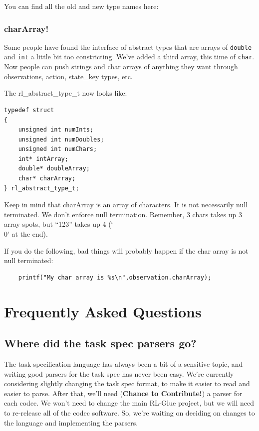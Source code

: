 \documentclass[11pt]{article}
\begin{document}
You can find all the old and new type names here:\newline
{}

\subsubsection{charArray!}
Some people have found the interface of abstract types that are arrays of \texttt{double} and \texttt{int} a little bit too constricting.  We've added a third array, this time of \texttt{char}.  Now people can push strings and char arrays of anything they want through observations, action, state\_key types, etc.

The rl\_abstract\_type\_t now looks like:
\begin{verbatim}
typedef struct
{
    unsigned int numInts;
    unsigned int numDoubles;
    unsigned int numChars;
    int* intArray;
    double* doubleArray;
    char* charArray;
} rl_abstract_type_t;
\end{verbatim}

Keep in mind that charArray is an array of characters.  It is not necessarily null terminated.  We don't enforce null termination. Remember, 3 chars takes up 3 array spots, but ``123'' takes up 4 (`\\0' at the end).

If you do the following, bad things will probably happen if the char array is not null terminated:
\begin{verbatim}
	printf("My char array is %s\n",observation.charArray);
\end{verbatim}

\section{Frequently Asked Questions}
\label{faq}

\subsection{Where did the task spec parsers go?}
The task specification language has always been a bit of a sensitive topic, and writing good parsers for the task spec has never been easy. We're currently considering slightly changing the task spec format, to make
it easier to read and easier to parse.  After that, we'll need (\textbf{Chance to Contribute!}) a parser for each codec.  We won't need to change the main RL-Glue project, but we will need to re-release all of the 
codec software.  So, we're waiting on deciding on changes to the language and implementing the parsers.
\end{document}
